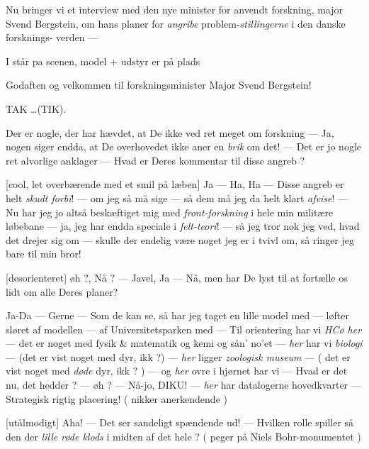 \documentclass[a4paper,11pt]{article}
\begin{document}
\begin{sketch}

          Nu bringer vi et interview med den nye minister for anvendt
  forskning, major Svend Bergstein, om hans planer
  for {\em angribe}\/ problem-{\em stillingerne}\/ i den danske forsknings-
  verden ---


  \scene
  I står pa scenen, model + udstyr er på plads 

          Godaften og velkommen til forskningsminister Major
  Svend Bergstein!

          TAK  \dots (TIK).

       Der er nogle, der har hævdet, at De ikke ved ret meget
  om forskning --- Ja, nogen siger endda, at De overhovedet
  ikke aner en {\em brik}\/ om det! --- Det er jo nogle ret alvorlige
  anklager --- Hvad er Deres kommentar til disse angreb ?

  

  [cool, let overbærende med et smil på læben]       Ja --- Ha, Ha --- Disse angreb er helt {\em skudt forbi}\/! --- om jeg 
  så må sige --- så dem må jeg da helt klart {\em afvise}\/! ---
  Nu har jeg jo altså beskæftiget mig med {\em front-forskning}\/
  i hele min militære løbebane --- ja, jeg har endda speciale
  i {\em  felt-teori}\/! --- så jeg tror nok jeg ved, hvad det drejer
  sig om --- skulle der endelig være noget jeg er i tvivl om,
  så ringer jeg bare til min bror!

  [desorienteret]  øh ?, Nå ? --- Javel, Ja  ---
  Nå, men har De lyst til at fortælle os lidt om alle Deres planer?

  
   Ja-Da --- Gerne --- Som de
  kan se, så har jeg taget en lille model med --- { løfter sløret af
    modellen } --- af Universitetsparken med --- Til orientering har vi
  {\em HCø her} --- det er noget med fysik \& matematik og kemi og sån'
  no'et --- {\em her}\/ har vi {\em  biologi}\/ --- (det er vist noget med dyr, ikk ?)
  --- {\em her}\/ ligger {\em  zoologisk museum}\/ --- ( det er vist
  noget med {\em  døde}\/ dyr,
  ikk ? ) --- og {\em  her}\/ ovre i hjørnet har vi --- Hvad er det nu, det
  hedder ? --- øh ? --- Nå-jo, DIKU! --- {\em her}\/ har datalogerne
  hovedkvarter --- Strategisk rigtig placering! ( nikker anerkendende )


  [utålmodigt]  Aha! --- Det ser sandeligt
  spændende ud! --- Hvilken rolle spiller så den der {\em lille røde klods}\/
  i midten af det hele ?  ( peger på Niels Bohr-monumentet )


\end{sketch}
\end{document}
